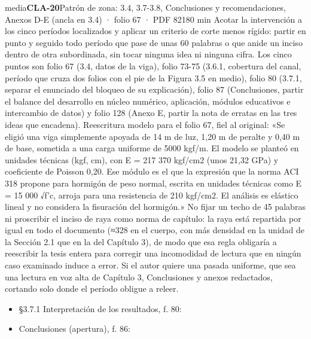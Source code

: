 \begin{ficha}{media}{\casilla\textbf{CLA-20}\quad{}\quad Patrón de zona: 3.4, 3.7-3.8, Conclusiones y recomendaciones, Anexos D-E (ancla en 3.4) · folio 67 · PDF 82\hfill 180 min}
Acotar la intervención a los cinco períodos localizados y aplicar un criterio de corte menos rígido: partir en punto y seguido todo período que pase de unas 60 palabras o que anide un inciso dentro de otra subordinada, sin tocar ninguna idea ni ninguna cifra. Los cinco puntos son folio 67 (3.4, datos de la viga), folio 73-75 (3.6.1, cobertura del canal, período que cruza dos folios con el pie de la Figura 3.5 en medio), folio 80 (3.7.1, separar el enunciado del bloqueo de su explicación), folio 87 (Conclusiones, partir el balance del desarrollo en núcleo numérico, aplicación, módulos educativos e intercambio de datos) y folio 128 (Anexo E, partir la nota de erratas en las tres ideas que encadena). Reescritura modelo para el folio 67, fiel al original: «Se eligió una viga simplemente apoyada de 14 m de luz, 1,20 m de peralte y 0,40 m de base, sometida a una carga uniforme de 5000 kgf/\allowbreak{}m. El modelo se planteó en unidades técnicas (kgf, cm), con E = 217 370 kgf/\allowbreak{}cm2 (unos 21,32 GPa) y coeficiente de Poisson 0,20. Ese módulo es el que la expresión que la norma ACI 318 propone para hormigón de peso normal, escrita en unidades técnicas como E = 15 000 {\mates √}f'c, arroja para una resistencia de 210 kgf/\allowbreak{}cm2. El análisis es elástico lineal y no considera la fisuración del hormigón.» No fijar un techo de 45 palabras ni proscribir el inciso de raya como norma de capítulo: la raya está repartida por igual en todo el documento ({\mates ≈}328 en el cuerpo, con más densidad en la unidad de la Sección 2.1 que en la del Capítulo 3), de modo que esa regla obligaría a reescribir la tesis entera para corregir una incomodidad de lectura que en ningún caso examinado induce a error. Si el autor quiere una pasada uniforme, que sea una lectura en voz alta de Capítulo 3, Conclusiones y anexos redactados, cortando solo donde el período obligue a releer.\par
{}\begin{itemize}[leftmargin=1.2em,itemsep=1pt,topsep=1pt]
\item {\small §3.7.1 Interpretación de los resultados, f. 80: }
\item {\small Conclusiones (apertura), f. 86: }

\end{itemize}
\end{ficha}
